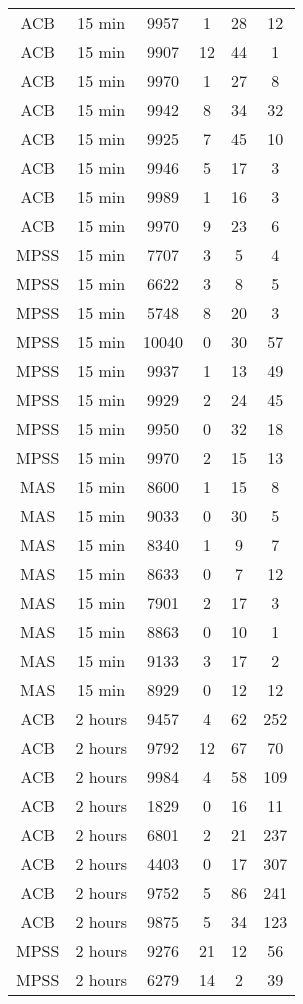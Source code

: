 \begin{center}
\begin{longtable}{cccccc}
\hline \hline
\endlastfoot
ACB	&	15 min	&	9957	&	1	&	28	&	12	\\
ACB	&	15 min	&	9907	&	12	&	44	&	1	\\
ACB	&	15 min	&	9970	&	1	&	27	&	8	\\
ACB	&	15 min	&	9942	&	8	&	34	&	32	\\
ACB	&	15 min	&	9925	&	7	&	45	&	10	\\
ACB	&	15 min	&	9946	&	5	&	17	&	3	\\
ACB	&	15 min	&	9989	&	1	&	16	&	3	\\
ACB	&	15 min	&	9970	&	9	&	23	&	6	\\
MPSS	&	15 min	&	7707	&	3	&	5	&	4	\\
MPSS	&	15 min	&	6622	&	3	&	8	&	5	\\
MPSS	&	15 min	&	5748	&	8	&	20	&	3	\\
MPSS	&	15 min	&	10040	&	0	&	30	&	57	\\
MPSS	&	15 min	&	9937	&	1	&	13	&	49	\\
MPSS	&	15 min	&	9929	&	2	&	24	&	45	\\
MPSS	&	15 min	&	9950	&	0	&	32	&	18	\\
MPSS	&	15 min	&	9970	&	2	&	15	&	13	\\
MAS	&	15 min	&	8600	&	1	&	15	&	8	\\
MAS	&	15 min	&	9033	&	0	&	30	&	5	\\
MAS	&	15 min	&	8340	&	1	&	9	&	7	\\
MAS	&	15 min	&	8633	&	0	&	7	&	12	\\
MAS	&	15 min	&	7901	&	2	&	17	&	3	\\
MAS	&	15 min	&	8863	&	0	&	10	&	1	\\
MAS	&	15 min	&	9133	&	3	&	17	&	2	\\
MAS	&	15 min	&	8929	&	0	&	12	&	12	\\
ACB	&	2 hours	&	9457	&	4	&	62	&	252	\\
ACB	&	2 hours	&	9792	&	12	&	67	&	70	\\
ACB	&	2 hours	&	9984	&	4	&	58	&	109	\\
ACB	&	2 hours	&	1829	&	0	&	16	&	11	\\
ACB	&	2 hours	&	6801	&	2	&	21	&	237	\\
ACB	&	2 hours	&	4403	&	0	&	17	&	307	\\
ACB	&	2 hours	&	9752	&	5	&	86	&	241	\\
ACB	&	2 hours	&	9875	&	5	&	34	&	123	\\
MPSS	&	2 hours	&	9276	&	21	&	12	&	56	\\
MPSS	&	2 hours	&	6279	&	14	&	2	&	39	\\

\end{longtable}
\end{center}
